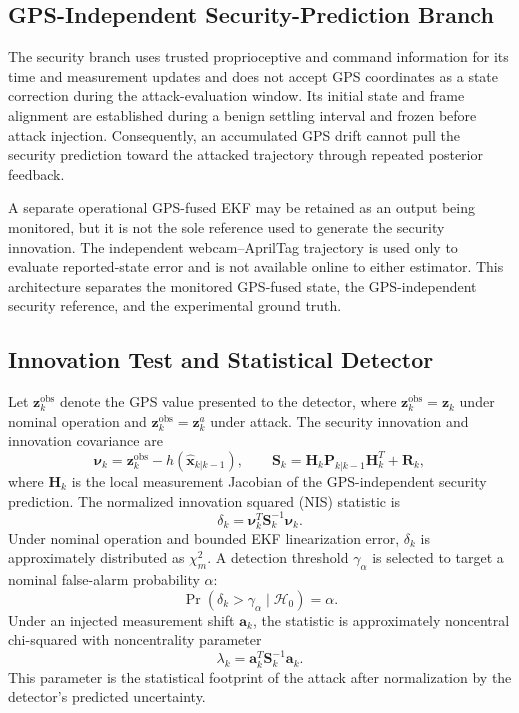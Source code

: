 \documentclass[11pt,a4paper]{article}
\begin{document}
\subsection{GPS-Independent Security-Prediction Branch}

The security branch uses trusted proprioceptive and command information for its
time and measurement updates and does not accept GPS coordinates as a state
correction during the attack-evaluation window. Its initial state and frame
alignment are established during a benign settling interval and frozen before
attack injection. Consequently, an accumulated GPS drift cannot pull the
security prediction toward the attacked trajectory through repeated posterior
feedback.

A separate operational GPS-fused EKF may be retained as an output being
monitored, but it is not the sole reference used to generate the security
innovation. The independent webcam--AprilTag trajectory is used only
to evaluate reported-state error and is not available online to either
estimator. This architecture separates the monitored GPS-fused state, the
GPS-independent security reference, and the experimental ground truth.

\subsection{Innovation Test and Statistical Detector}
Let $\mathbf{z}^{\mathrm{obs}}_k$ denote the GPS value presented to the
detector, where $\mathbf{z}^{\mathrm{obs}}_k=\mathbf{z}_k$ under nominal
operation and $\mathbf{z}^{\mathrm{obs}}_k=\mathbf{z}^{a}_k$ under attack. The
security innovation and innovation covariance are
\begin{equation}
\boldsymbol{\nu}_k =
\mathbf{z}^{\mathrm{obs}}_k-h(\hat{\mathbf{x}}_{k|k-1}),
\qquad
\mathbf{S}_k =
\mathbf{H}_k\mathbf{P}_{k|k-1}\mathbf{H}_k^T+\mathbf{R}_k,
\end{equation}
where $\mathbf{H}_k$ is the local measurement Jacobian of the
GPS-independent security prediction. The normalized innovation squared (NIS)
statistic is
\begin{equation}
\delta_k=\boldsymbol{\nu}_k^T\mathbf{S}_k^{-1}\boldsymbol{\nu}_k.
\end{equation}
Under nominal operation and bounded EKF linearization error, $\delta_k$ is approximately distributed as $\chi^2_m$. A detection threshold $\gamma_\alpha$ is selected to target a nominal false-alarm probability $\alpha$:
\begin{equation}
\Pr(\delta_k>\gamma_\alpha\mid \mathcal{H}_0)=\alpha.
\end{equation}
Under an injected measurement shift $\mathbf{a}_k$, the statistic is approximately noncentral chi-squared with noncentrality parameter
\begin{equation}
\lambda_k=\mathbf{a}_k^T\mathbf{S}_k^{-1}\mathbf{a}_k.
\end{equation}
This parameter is the statistical footprint of the attack after normalization by the detector's predicted uncertainty.
\end{document}
